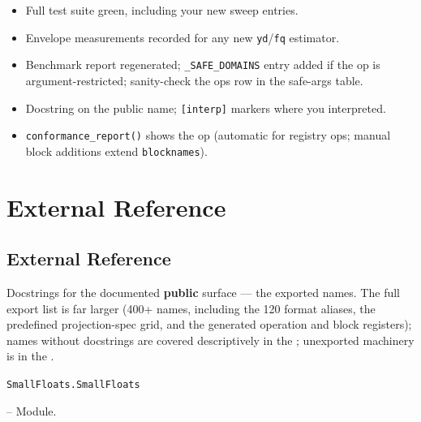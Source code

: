 \label{16308398306918412518}{}


\begin{itemize}
\item Full test suite green, including your new sweep entries.


\item Envelope measurements recorded for any new \texttt{yd}/\texttt{fq} estimator.


\item Benchmark report regenerated; \texttt{\_SAFE\_DOMAINS} entry added if the op is argument-restricted; sanity-check the op{\textquotesingle}s row in the safe-args table.


\item Docstring on the public name; \texttt{[interp]} markers where you interpreted.


\item \texttt{conformance\_report()} shows the op (automatic for registry ops; manual block additions extend \texttt{blocknames}).

\end{itemize}


\part{External Reference}


\chapter{External Reference}



\label{5597696625397351643}{}


Docstrings for the documented \textbf{public} surface — the exported names. The full export list is far larger (400+ names, including the 120 format aliases, the predefined projection-spec grid, and the generated operation and block registers); names without docstrings are covered descriptively in the ; unexported machinery is in the .


\hypertarget{14453628373362608485}{\texttt{SmallFloats.SmallFloats}}  -- {Module.}

